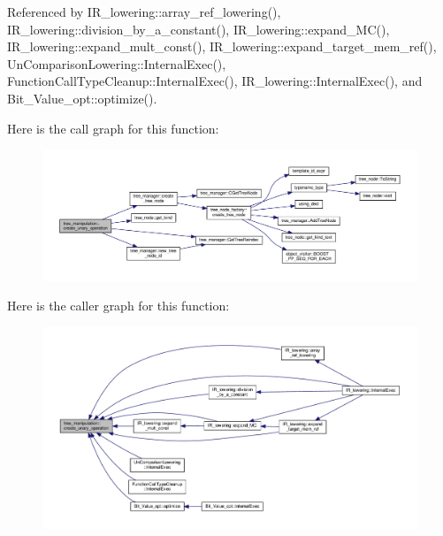 Referenced by I\+R\+\_\+lowering\+::array\+\_\+ref\+\_\+lowering(), I\+R\+\_\+lowering\+::division\+\_\+by\+\_\+a\+\_\+constant(), I\+R\+\_\+lowering\+::expand\+\_\+\+M\+C(), I\+R\+\_\+lowering\+::expand\+\_\+mult\+\_\+const(), I\+R\+\_\+lowering\+::expand\+\_\+target\+\_\+mem\+\_\+ref(), Un\+Comparison\+Lowering\+::\+Internal\+Exec(), Function\+Call\+Type\+Cleanup\+::\+Internal\+Exec(), I\+R\+\_\+lowering\+::\+Internal\+Exec(), and Bit\+\_\+\+Value\+\_\+opt\+::optimize().

Here is the call graph for this function\+:
\nopagebreak
\begin{figure}[H]
\begin{center}
\leavevmode
\includegraphics[width=350pt]{d0/d99/classtree__manipulation_ad87bbd38f417db13f3699aeccf6011a4_cgraph}
\end{center}
\end{figure}
Here is the caller graph for this function\+:
\nopagebreak
\begin{figure}[H]
\begin{center}
\leavevmode
\includegraphics[width=350pt]{d0/d99/classtree__manipulation_ad87bbd38f417db13f3699aeccf6011a4_icgraph}
\end{center}
\end{figure}
\mbox{\label{classtree__manipulation_ada8044d7be8b0243bd32ae1dd213ce46}} 
